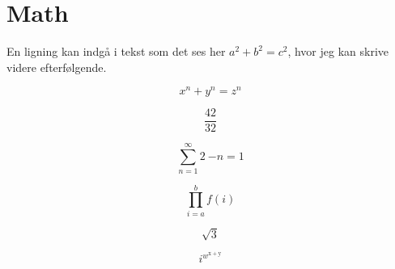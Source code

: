 \section{Math}

En ligning kan indgå i tekst som det ses her \(a^2 + b^2 = c^2 \), hvor jeg kan skrive videre efterfølgende.

\[x^n + y^n = z^n \]

\[ \frac{42}{32} \]

\[ \sum_{n=1}^{\infty} 2~{-n} = 1 \]

\[ \prod_{i=a}^{b} f(i) \]

\[ \sqrt{3} \]

\[ i^{w^{\mathrm{x + y}}} \]